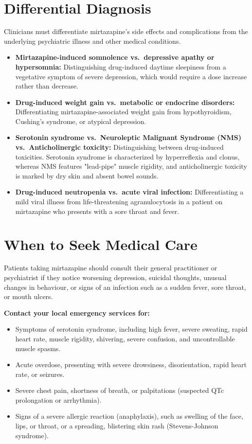 \section*{Differential Diagnosis}
Clinicians must differentiate mirtazapine's side effects and complications from the underlying psychiatric illness and other medical conditions.
\begin{itemize}
    \item \textbf{Mirtazapine-induced somnolence vs.\ depressive apathy or hypersomnia:} Distinguishing drug-induced daytime sleepiness from a vegetative symptom of severe depression, which would require a dose increase rather than decrease.
    \item \textbf{Drug-induced weight gain vs.\ metabolic or endocrine disorders:} Differentiating mirtazapine-associated weight gain from hypothyroidism, Cushing's syndrome, or atypical depression.
    \item \textbf{Serotonin syndrome vs.\ Neuroleptic Malignant Syndrome (NMS) vs.\ Anticholinergic toxicity:} Distinguishing between drug-induced toxicities. Serotonin syndrome is characterized by hyperreflexia and clonus, whereas NMS features "lead-pipe" muscle rigidity, and anticholinergic toxicity is marked by dry skin and absent bowel sounds.
    \item \textbf{Drug-induced neutropenia vs.\ acute viral infection:} Differentiating a mild viral illness from life-threatening agranulocytosis in a patient on mirtazapine who presents with a sore throat and fever.
\end{itemize}

\section*{When to Seek Medical Care}
Patients taking mirtazapine should consult their general practitioner or psychiatrist if they notice worsening depression, suicidal thoughts, unusual changes in behaviour, or signs of an infection such as a sudden fever, sore throat, or mouth ulcers.

\textbf{Contact your local emergency services for:}
\begin{itemize}
    \item Symptoms of serotonin syndrome, including high fever, severe sweating, rapid heart rate, muscle rigidity, shivering, severe confusion, and uncontrollable muscle spasms.
    \item Acute overdose, presenting with severe drowsiness, disorientation, rapid heart rate, or seizures.
    \item Severe chest pain, shortness of breath, or palpitations (suspected QTc prolongation or arrhythmia).
    \item Signs of a severe allergic reaction (anaphylaxis), such as swelling of the face, lips, or throat, or a spreading, blistering skin rash (Stevens-Johnson syndrome).
\end{itemize}

